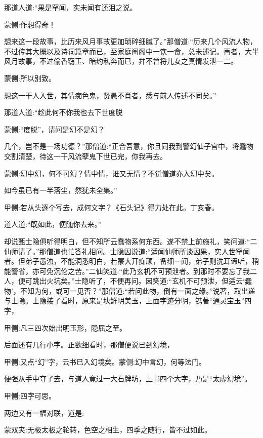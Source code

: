 \begin{parag}
    那道人道:“果是罕闻，实未闻有还泪之说。\begin{note}蒙侧:作想得奇！\end{note}想来这一段故事，比历来风月事故更加琐碎细腻了。”那僧道:“历来几个风流人物，不过传其大概以及诗词篇章而已，至家庭闺阁中一饮一食，总未述记。再者，大半风月故事，不过偷香窃玉、暗约私奔而已，幷不曾将儿女之真情发泄一二。\begin{note}蒙侧:所以别致。\end{note}想这一干人入世，其情痴色鬼，贤愚不肖者，悉与前人传述不同矣。”
\end{parag}


\begin{parag}
    那道人道:“趁此何不你我也去下世度脱\begin{note}蒙侧:“度脱”，请问是幻不是幻？\end{note}几个，岂不是一场功德？”那僧道:“正合吾意，你且同我到警幻仙子宫中，将蠢物交割清楚，待这一干风流孽鬼下世已完，你我再去。\begin{note}蒙侧:幻中幻，何不可幻？情中情，谁又无情？不觉僧道亦入幻中矣。\end{note}如今虽已有一半落尘，然犹未全集。”\begin{note}甲侧:若从头逐个写去，成何文字？《石头记》得力处在此。丁亥春。\end{note}
\end{parag}


\begin{parag}
    道人道:“既如此，便随你去来。”
\end{parag}


\begin{parag}
    却说甄士隐俱听得明白，但不知所云蠢物系何东西。遂不禁上前施礼，笑问道:“二仙师请了。”那僧道也忙答礼相问。士隐因说道:“适闻仙师所谈因果，实人世罕闻者。但弟子愚浊，不能洞悉明白，若蒙大开痴顽，备细一闻，弟子则洗耳谛听，稍能警省，亦可免沉伦之苦。”二仙笑道:“此乃玄机不可预泄者。到那时不要忘了我二人，便可跳出火坑矣。”士隐听了，不便再问。因笑道:“玄机不可预泄，但适云‘蠢物’，不知为何，或可一见否？”那僧道:“若问此物，倒有一面之缘。”说著，取出递与士隐。士隐接了看时，原来是块鲜明美玉，上面字迹分明，镌著“通灵宝玉”四字，\begin{note}甲侧:凡三四次始出明玉形，隐屈之至。\end{note}后面还有几行小字。正欲细看时，那僧便说已到幻境，\begin{note}甲侧:又点“幻”字，云书已入幻境矣。蒙侧:幻中言幻，何等法门。\end{note}便强从手中夺了去，与道人竟过一大石牌坊，上书四个大字，乃是“太虚幻境”。\begin{note}甲侧:四字可思。\end{note}两边又有一幅对联，道是:\begin{note}蒙双夹:无极太极之轮转，色空之相生，四季之随行，皆不过如此。\end{note}
\end{parag}


